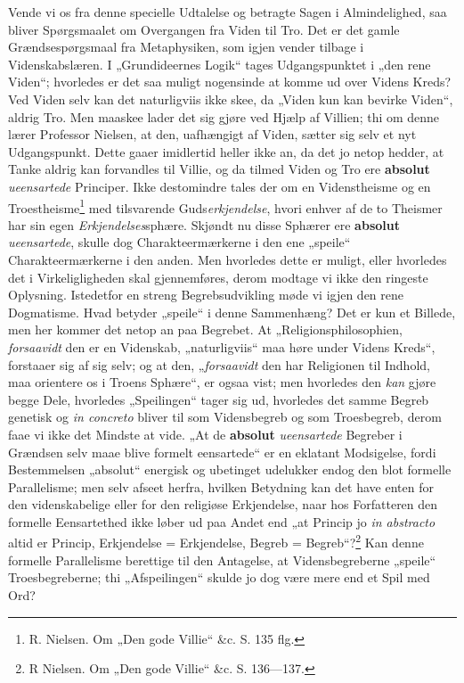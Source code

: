 \documentclass[12pt,a4paper]{book}
\newcommand{\opage}[1]{\marginnote{\footnotesize\textit{[#1]}}}
\begin{document}
Vende vi os fra denne specielle Udtalelse og
betragte Sagen i Almindelighed, saa bliver Spørgsmaalet
om Overgangen fra Viden til Tro. Det er det
gamle Grændsespørgsmaal fra Metaphysiken, som igjen
\opage{35}\setcounter{footnote}{0}%
vender tilbage i Videnskabslæren. I „Grundideernes
Logik“ tages Udgangspunktet i „den rene Viden“; hvorledes
er det saa muligt nogensinde at komme ud over
Videns Kreds? Ved Viden selv kan det naturligviis
ikke skee, da „Viden kun kan bevirke Viden“, aldrig Tro.
Men maaskee lader det sig gjøre ved Hjælp af Villien;
thi om denne lærer Professor Nielsen, at den, uafhængigt
af Viden, sætter sig selv et nyt Udgangspunkt.
Dette gaaer imidlertid heller ikke an, da det jo netop
hedder, at Tanke aldrig kan forvandles til Villie, og da
tilmed Viden og Tro ere \textbf{absolut} \emph{ueensartede} Principer.
Ikke destomindre tales der om en Videnstheisme
og en Troestheisme\footnote{R. Nielsen. Om „Den gode Villie“ \&c. S. 135 flg.} med tilsvarende Guds\emph{erkjendelse},
hvori enhver af de to Theismer har sin egen
\emph{Erkjendelses}sphære. Skjøndt nu disse Sphærer ere
\textbf{absolut} \emph{ueensartede}, skulle dog Charakteermærkerne i
den ene „speile“ Charakteermærkerne i den anden. Men
hvorledes dette er muligt, eller hvorledes det i Virkeligligheden
skal gjennemføres, derom modtage vi ikke den
ringeste Oplysning. Istedetfor en streng Begrebsudvikling
møde vi igjen den rene Dogmatisme. Hvad betyder
„speile“ i denne Sammenhæng? Det er kun et Billede,
men her kommer det netop an paa Begrebet. At „Religionsphilosophien,
\emph{forsaavidt} den er en Videnskab, „naturligviis“
maa høre under Videns Kreds“, forstaaer sig af sig
selv; og at den, „\emph{forsaavidt} den har Religionen til Indhold,
maa orientere os i Troens Sphære“, er ogsaa vist; men
hvorledes den \emph{kan} gjøre begge Dele, hvorledes „Spei\opage{36}\setcounter{footnote}{0}lingen“
tager sig ud, hvorledes det samme Begreb genetisk
og \textit{in concreto} bliver til som Vidensbegreb og
som Troesbegreb, derom faae vi ikke det Mindste at
vide. „At de \textbf{absolut} \emph{ueensartede} Begreber i Grændsen
selv maae blive formelt eensartede“ er en eklatant Modsigelse,
fordi Bestemmelsen „absolut“ energisk og ubetinget
udelukker endog den blot formelle Parallelisme;
men selv afseet herfra, hvilken Betydning kan det have
enten for den videnskabelige eller for den religiøse Erkjendelse,
naar hos Forfatteren den formelle Eensartethed ikke
løber ud paa Andet end „at Princip jo \textit{in abstracto} altid er
Princip, Erkjendelse = Erkjendelse, Begreb = Begreb“?\footnote{R Nielsen. Om „Den gode Villie“ \&c. S. 136---137.}
Kan denne formelle Parallelisme berettige til den Antagelse,
at Vidensbegreberne „speile“ Troesbegreberne;
thi „Afspeilingen“ skulde jo dog være mere end et Spil
med Ord?
\end{document}
